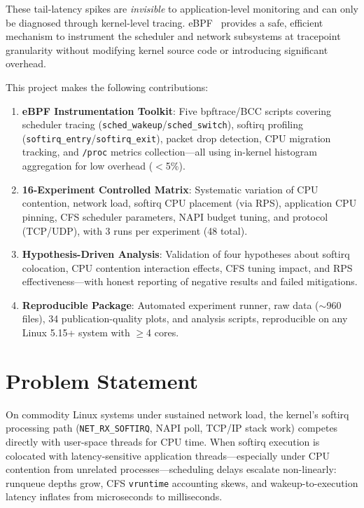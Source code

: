 \documentclass[11pt,a4paper]{article}
\begin{document}
These tail-latency spikes are \emph{invisible} to application-level monitoring and can only be diagnosed through kernel-level tracing. eBPF~\cite{starovoitov2014ebpf} provides a safe, efficient mechanism to instrument the scheduler and network subsystems at tracepoint granularity without modifying kernel source code or introducing significant overhead.

This project makes the following contributions:

\begin{enumerate}[leftmargin=*]
  \item \textbf{eBPF Instrumentation Toolkit}: Five bpftrace/BCC scripts covering scheduler tracing (\texttt{sched\_wakeup}/\texttt{sched\_switch}), softirq profiling (\texttt{softirq\_entry}/\texttt{softirq\_exit}), packet drop detection, CPU migration tracking, and \texttt{/proc} metrics collection---all using in-kernel histogram aggregation for low overhead ($<$5\%).

  \item \textbf{16-Experiment Controlled Matrix}: Systematic variation of CPU contention, network load, softirq CPU placement (via RPS), application CPU pinning, CFS scheduler parameters, NAPI budget tuning, and protocol (TCP/UDP), with 3 runs per experiment (48 total).

  \item \textbf{Hypothesis-Driven Analysis}: Validation of four hypotheses about softirq colocation, CPU contention interaction effects, CFS tuning impact, and RPS effectiveness---with honest reporting of negative results and failed mitigations.

  \item \textbf{Reproducible Package}: Automated experiment runner, raw data ($\sim$960 files), 34 publication-quality plots, and analysis scripts, reproducible on any Linux 5.15+ system with $\geq$4 cores.
\end{enumerate}


\section{Problem Statement}
\label{sec:problem}

On commodity Linux systems under sustained network load, the kernel's softirq processing path (\texttt{NET\_RX\_SOFTIRQ}, NAPI poll, TCP/IP stack work) competes directly with user-space threads for CPU time. When softirq execution is colocated with latency-sensitive application threads---especially under CPU contention from unrelated processes---scheduling delays escalate non-linearly: runqueue depths grow, CFS \texttt{vruntime} accounting skews, and wakeup-to-execution latency inflates from microseconds to milliseconds.
\end{document}
